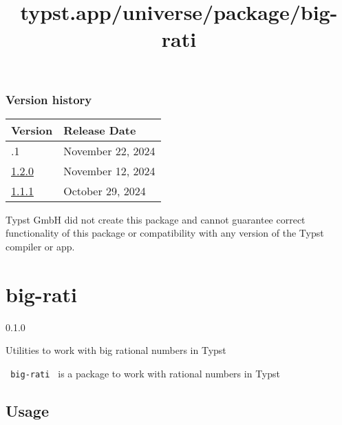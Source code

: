 \subsubsection{Version history}\label{version-history}

\begin{longtable}[]{@{}ll@{}}
\toprule\noalign{}
Version & Release Date \\
\midrule\noalign{}
\endhead
\bottomrule\noalign{}
\endlastfoot
1.2.1 & November 22, 2024 \\
\href{https://typst.app/universe/package/typslides/1.2.0/}{1.2.0} &
November 12, 2024 \\
\href{https://typst.app/universe/package/typslides/1.1.1/}{1.1.1} &
October 29, 2024 \\
\end{longtable}

Typst GmbH did not create this package and cannot guarantee correct
functionality of this package or compatibility with any version of the
Typst compiler or app.


\title{typst.app/universe/package/big-rati}

\label{banner}
\section{big-rati}\label{big-rati}

{ 0.1.0 }

Utilities to work with big rational numbers in Typst

\label{readme}
\texttt{\ big-rati\ } is a package to work with rational numbers in
Typst

\subsection{Usage}\label{usage}

\begin{Shaded}
\begin{Highlighting}[]




\end{Highlighting}
\end{Shaded}


